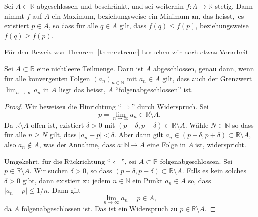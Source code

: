 \documentclass[../main.tex]{subfiles}
\begin{document}
\begin{theorem}\label{thm:extreme}
  Sei $A \subset \mathbb{R}$ abgeschlossen
  und beschränkt,
  und sei weiterhin $f \colon A \to \mathbb{R}$
  stetig. Dann nimmt $f$ auf $A$ ein
  Maximum, beziehungsweise ein Minimum an,
  das heisst,~es existiert $p \in A$,
  so dass für alle $q \in A$ gilt,
  dass $f(q) \leq f(p)$, beziehungsweise $f(q) \geq f(p)$.
\end{theorem}

Für den Beweis von Theorem~\ref{thm:extreme}
brauchen wir noch etwas Vorarbeit.

\begin{lemma*}[Folgenabgeschlossenheit]
  Sei $A \subset \mathbb{R}$ eine nichtleere Teilmenge.
  Dann ist $A$ abgeschlossen, genau dann, wenn für
  alle konvergenten Folgen
  ${(a_{n})}_{n \in \mathbb{N}}$ mit
  $a_n \in A$ gilt, dass auch
  der Grenzwert $\lim_{n \to \infty} a_n$ in $A$ 
  liegt das heisst, $A$ ``folgenabgeschlossen'' ist.
\end{lemma*}

\begin{proof}
  Wir beweisen die Hinrichtung ``$\Rightarrow$'' durch Widerspruch.
  Sei
  \[
    p = \lim_{n \to \infty} a_n \in \mathbb{R} \setminus A.
  \]
  Da $\mathbb{R} \setminus A$ offen ist,
  existiert $\delta > 0$ mit $(p - \delta, p + \delta)
  \subset \mathbb{R} \setminus A$.
  Wähle $N \in \mathbb{N}$  so dass für alle $n \geq N$
  gilt, dass $|a_n - p| < \delta$.
  Aber dann gilt $a_n \in (p - \delta, p + \delta)
  \subset \mathbb{R} \setminus A$,
  also $a_n \notin A$, was der Annahme, dass 
  $a \colon \mathbb{N} \to A$
  eine Folge in $A$ ist, widerspricht.

  Umgekehrt, für die Rückrichtung ``$\Leftarrow$'', sei
  $A \subset \mathbb{R}$ folgenabgeschlossen.
  Sei $p \in \mathbb{R} \setminus A$. Wir suchen
  $\delta > 0$, so dass $(p - \delta, p + \delta)
  \subset \mathbb{R} \setminus A$. Falls es kein
  solches $\delta > 0$ gibt, dann existiert zu jedem
  $n \in \mathbb{N}$ ein Punkt $a_n \in A$ so, dass
  $|a_n - p| \leq 1/n$.
  Dann gilt
  \[
    \lim_{n \to \infty} a_n = p \in A,
  \]
  da $A$ folgenabgeschlossen ist. Das ist ein Widerspruch
  zu $p \in \mathbb{R} \setminus A$.
\end{proof}
\end{document}
